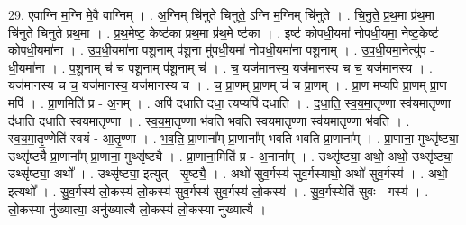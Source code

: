 \documentclass[17pt]{extarticle}
\begin{document}
29. ए॒वाग्नि म॒ग्नि मे॒वै वाग्निम् । . अ॒ग्निम् चि॑नुते चिनुते॒ ऽग्नि म॒ग्निम् चि॑नुते । . चि॒नु॒ते॒ प्र॒थ॒मा प्र॑थ॒मा चि॑नुते चिनुते प्रथ॒मा । . प्र॒थ॒मेष्ट॒ केष्ट॑का प्रथ॒मा प्र॑थ॒मे ष्ट॑का । . इष्ट॑ कोपधी॒यमा॑ नोपधी॒यमा॒ नेष्ट॒केष्ट॑ कोपधी॒यमा॑ना । . उ॒प॒धी॒यमा॑ना पशू॒नाम् प॑शू॒ना मु॑पधी॒यमा॑ नोपधी॒यमा॑ना पशू॒नाम् । . उ॒प॒धी॒यमा॒नेत्यु॑प - धी॒यमा॑ना । . प॒शू॒नाम् च॑ च पशू॒नाम् प॑शू॒नाम् च॑ । . च॒ यज॑मानस्य॒ यज॑मानस्य च च॒ यज॑मानस्य । . यज॑मानस्य च च॒ यज॑मानस्य॒ यज॑मानस्य च । . च॒ प्रा॒णम् प्रा॒णम् च॑ च प्रा॒णम् । . प्रा॒ण मप्यपि॑ प्रा॒णम् प्रा॒ण मपि॑ । . प्रा॒णमिति॑ प्र - अ॒नम् । . अपि॑ दधाति दधा॒ त्यप्यपि॑ दधाति । . द॒धा॒ति॒ स्व॒य॒मा॒तृ॒ण्णा स्व॑यमातृ॒ण्णा द॑धाति दधाति स्वयमातृ॒ण्णा । . स्व॒य॒मा॒तृ॒ण्णा भ॑वति भवति स्वयमातृ॒ण्णा स्व॑यमातृ॒ण्णा भ॑वति । . स्व॒य॒मा॒तृ॒ण्णेति॑ स्वयं - आ॒तृ॒ण्णा । . भ॒व॒ति॒ प्रा॒णाना᳚म् प्रा॒णाना᳚म् भवति भवति प्रा॒णाना᳚म् । . प्रा॒णाना॒ मुथ्सृ॑ष्ट्या॒ उथ्सृ॑ष्ट्यै प्रा॒णाना᳚म् प्रा॒णाना॒ मुथ्सृ॑ष्ट्यै । . प्रा॒णाना॒मिति॑ प्र - अ॒नाना᳚म् । . उथ्सृ॑ष्ट्या॒ अथो॒ अथो॒ उथ्सृ॑ष्ट्या॒ उथ्सृ॑ष्ट्या॒ अथो᳚ । . उथ्सृ॑ष्ट्या॒ इत्युत् - सृ॒ष्ट्यै॒ । . अथो॑ सुव॒र्गस्य॑ सुव॒र्गस्याथो॒ अथो॑ सुव॒र्गस्य॑ । . अथो॒ इत्यथो᳚ । . सु॒व॒र्गस्य॑ लो॒कस्य॑ लो॒कस्य॑ सुव॒र्गस्य॑ सुव॒र्गस्य॑ लो॒कस्य॑ । . सु॒व॒र्गस्येति॑ सुवः - गस्य॑ । . लो॒कस्या नु॑ख्यात्या॒ अनु॑ख्यात्यै लो॒कस्य॑ लो॒कस्या नु॑ख्यात्यै । \newline
\end{document}
